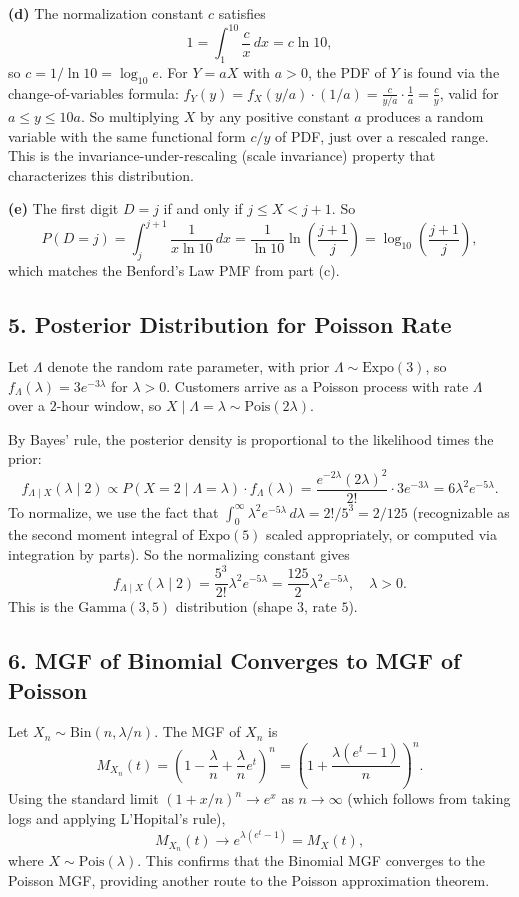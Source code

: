 \documentclass{article}
\begin{document}
\textbf{(d)} The normalization constant $c$ satisfies
$$
1 = \int_1^{10}\frac{c}{x}\,dx = c\ln 10,
$$
so $c = 1/\ln 10 = \log_{10} e$. For $Y = aX$ with $a > 0$, the PDF of $Y$ is found via the change-of-variables formula: $f_Y(y) = f_X(y/a)\cdot(1/a) = \frac{c}{y/a}\cdot\frac{1}{a} = \frac{c}{y}$, valid for $a \le y \le 10a$. So multiplying $X$ by any positive constant $a$ produces a random variable with the same functional form $c/y$ of PDF, just over a rescaled range. This is the invariance-under-rescaling (scale invariance) property that characterizes this distribution.

\textbf{(e)} The first digit $D = j$ if and only if $j \le X < j+1$. So
$$
P(D = j) = \int_j^{j+1}\frac{1}{x\ln 10}\,dx = \frac{1}{\ln 10}\ln\!\left(\frac{j+1}{j}\right) = \log_{10}\!\left(\frac{j+1}{j}\right),
$$
which matches the Benford's Law PMF from part (c).

\subsection*{5. Posterior Distribution for Poisson Rate}

Let $\Lambda$ denote the random rate parameter, with prior $\Lambda \sim \text{Expo}(3)$, so $f_\Lambda(\lambda) = 3e^{-3\lambda}$ for $\lambda > 0$. Customers arrive as a Poisson process with rate $\Lambda$ over a $2$-hour window, so $X \mid \Lambda = \lambda \sim \text{Pois}(2\lambda)$.

By Bayes' rule, the posterior density is proportional to the likelihood times the prior:
$$
f_{\Lambda \mid X}(\lambda \mid 2) \propto P(X = 2 \mid \Lambda = \lambda)\cdot f_\Lambda(\lambda) = \frac{e^{-2\lambda}(2\lambda)^2}{2!}\cdot 3e^{-3\lambda} = 6\lambda^2 e^{-5\lambda}.
$$
To normalize, we use the fact that $\int_0^\infty \lambda^2 e^{-5\lambda}\,d\lambda = 2!/5^3 = 2/125$ (recognizable as the second moment integral of $\text{Expo}(5)$ scaled appropriately, or computed via integration by parts). So the normalizing constant gives
$$
f_{\Lambda \mid X}(\lambda \mid 2) = \frac{5^3}{2!}\lambda^2 e^{-5\lambda} = \frac{125}{2}\lambda^2 e^{-5\lambda}, \quad \lambda > 0.
$$
This is the $\text{Gamma}(3, 5)$ distribution (shape $3$, rate $5$).

\subsection*{6. MGF of Binomial Converges to MGF of Poisson}

Let $X_n \sim \text{Bin}(n, \lambda/n)$. The MGF of $X_n$ is
$$
M_{X_n}(t) = \left(1 - \frac{\lambda}{n} + \frac{\lambda}{n}e^t\right)^n = \left(1 + \frac{\lambda(e^t - 1)}{n}\right)^n.
$$
Using the standard limit $(1 + x/n)^n \to e^x$ as $n \to \infty$ (which follows from taking logs and applying L'Hopital's rule),
$$
M_{X_n}(t) \to e^{\lambda(e^t - 1)} = M_X(t),
$$
where $X \sim \text{Pois}(\lambda)$. This confirms that the Binomial MGF converges to the Poisson MGF, providing another route to the Poisson approximation theorem.
\end{document}
